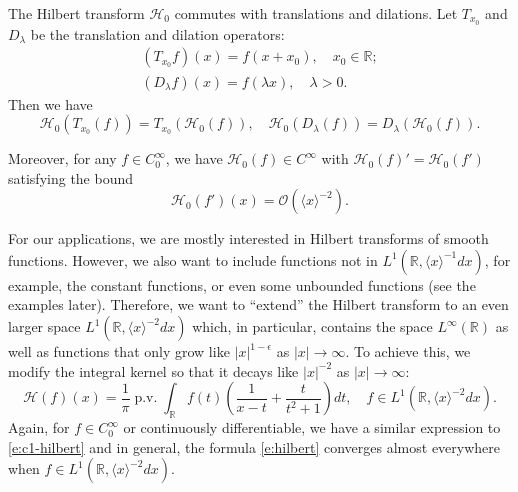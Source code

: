 \documentclass[reqno,12pt,letterpaper]{amsart}
\numberwithin{equation}{section}
\numberwithin{prop}{section}
\DeclareMathOperator{\pv}{p.v.}
\begin{document}

The Hilbert transform $\mathcal{H}_0$ commutes with translations and dilations. Let $T_{x_0}$ and $D_\lambda$ be the translation and dilation operators:
\begin{equation*}
\begin{split}
(T_{x_0}f)(x)=f(x+x_0), \quad x_0\in\mathbb{R};\\
(D_\lambda f)(x)=f(\lambda x), \quad \lambda>0.
\end{split}
\end{equation*}
Then we have
\begin{equation}
\label{e:hilbert-scale}
\mathcal{H}_0(T_{x_0}(f))=T_{x_0}(\mathcal{H}_0(f)),
\quad
\mathcal{H}_0(D_\lambda(f))=D_\lambda(\mathcal{H}_0(f)).
\end{equation}


Moreover, for any $f\in C_0^\infty$, we have $\mathcal{H}_0(f)\in C^\infty$ with 
$\mathcal{H}_0(f)'=\mathcal{H}_0(f')$ satisfying the bound 
\begin{equation}
\label{e:hilbert-deriative-bound}
\mathcal{H}_0(f')(x)=\mathcal{O}(\langle x\rangle^{-2}).
\end{equation}


For our applications, we are mostly interested in Hilbert transforms of smooth functions. However, we also want to include functions not in $L^1(\mathbb{R},\langle x\rangle^{-1}dx)$, for example, the constant functions, or even some unbounded functions (see the examples later). Therefore, we want to ``extend'' the Hilbert transform to an even larger space $L^1(\mathbb{R},\langle x\rangle^{-2}dx)$ which, in particular, contains the space $L^\infty(\mathbb{R})$ as well as functions that only grow like $|x|^{1-\epsilon}$ as $|x|\to\infty$. To achieve this, we modify the integral kernel so that it decays like $|x|^{-2}$ as $|x|\to\infty$:
\begin{equation}
\label{e:hilbert}
\mathcal{H}(f)(x)=\frac{1}{\pi}\pv\int_{\mathbb{R}}f(t)\left(\frac{1}{x-t}+\frac{t}{t^2+1}\right)dt,
\quad f\in L^1(\mathbb{R},\langle x\rangle^{-2}dx).
\end{equation}
Again, for $f\in C_0^\infty$ or continuously differentiable, we have a similar expression to \eqref{e:c1-hilbert} and in general, the formula \eqref{e:hilbert} converges almost everywhere when $f\in L^1(\mathbb{R},\langle x\rangle^{-2}dx)$.
\end{document}
